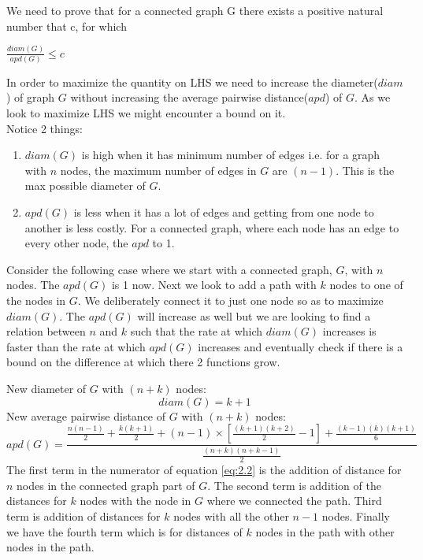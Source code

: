 \documentclass[11pt]{article}
\begin{document}
We need to prove that for a connected graph G there exists a positive natural number that c, for which
\begin{center}
	$ \frac{diam(G)}{apd(G)} \leq c $
\end{center}

In order to maximize the quantity on LHS we need to increase the diameter($ diam $) of graph $ G $ without increasing the average pairwise distance($ apd $) of $ G $. As we look to maximize LHS we might encounter a bound on it. \\

Notice 2 things:
\begin{enumerate}
\item $ diam(G) $ is high when it has minimum number of edges i.e. for a graph with $ n $ nodes, the maximum number of edges in $ G $ are $ (n-1) $. This is the max possible diameter of $ G $.

\item $ apd(G) $ is less when it has a lot of edges and getting from one node to another is less costly. For a connected graph, where each node has an edge to every other node, the $ apd $ to 1.
\end{enumerate}

Consider the following case where we start with a connected graph, $ G $, with $ n $ nodes. The $ apd(G) $ is 1 now. Next we look to add a path with $ k $ nodes to one of the nodes in $ G $. We deliberately connect it to just one node so as to maximize $ diam(G) $. The $ apd(G) $ will increase as well but we are looking to find a relation between $ n $ and $ k $ such that the rate at which $ diam(G) $ increases is faster than the rate at which $ apd(G) $ increases and eventually check if there is a bound on the difference at which there 2 functions grow.

New diameter of $ G $ with $ (n+k) $ nodes:
\begin{equation} \label{eq:2.1}
diam(G) = k+1
\end{equation}
New average pairwise distance of $ G $ with $ (n+k) $ nodes:
\begin{equation} \label{eq:2.2}
apd(G) = \frac{\frac{n(n-1)}{2} + \frac{k(k+1)}{2} + (n-1)\times \left[\frac{(k+1)(k+2)}{2} - 1\right] + \frac{(k-1)(k)(k+1)}{6}}{\frac{(n+k)(n+k-1)}{2}}
\end{equation}
The first term in the numerator of equation \ref{eq:2.2} is the addition of distance for $ n $ nodes in the connected graph part of $ G $. The second term is addition of the distances for $ k $ nodes with the node in $ G $ where we connected the path. Third term is addition of distances for $ k $ nodes with all the other $ n-1 $ nodes. Finally we have the fourth term which is for distances of $ k $ nodes in the path with other nodes in the path. \\
\end{document}
